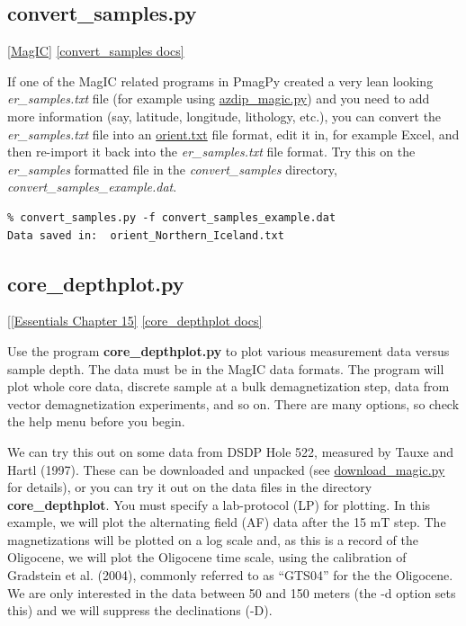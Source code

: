 \documentclass[11pt]{book}
\begin{document}
{{{\subsection{convert\_samples.py}
\href{#MagIC}{[MagIC]}
\href{http://earthref.org/PmagPy/pmagpydocs/convert_samples-module.html}{[convert\_samples docs]}

If one of the MagIC related programs in PmagPy created a very lean looking {\it er\_samples.txt} file (for example using \href{#azdip_magic.py}{azdip\_magic.py}) and you need to add more information (say, latitude, longitude, lithology, etc.), you can convert the {\it er\_samples.txt} file into an \href{#orientation_magic.py}{orient.txt} file format, edit it in, for example Excel, and then re-import it back into the {\it er\_samples.txt} file format.  Try this on the {\it er\_samples} formatted file in the {\it convert\_samples} directory, {\it convert\_samples\_example.dat}.

\begin{verbatim}
% convert_samples.py -f convert_samples_example.dat 
Data saved in:  orient_Northern_Iceland.txt
\end{verbatim}




\subsection{core\_depthplot.py} [\href{http://magician.ucsd.edu/Essentials_2/WebBook2ch15.html#ch15}{[Essentials Chapter 15]}
\href{http://earthref.org/PmagPy/pmagpydocs/core_depthplot-module.html}{[core\_depthplot docs]}

Use the program {\bf core\_depthplot.py} to plot various measurement data versus sample depth.   The data must be in the MagIC data formats.  The program will plot whole core data, discrete sample at a bulk demagnetization step, data from vector demagnetization experiments, and so on.  There are many options, so check the help menu before you begin.     

We can try this out on some data from DSDP Hole 522, measured by Tauxe and Hartl (1997).  \nocite{tauxe97}  These can be downloaded and unpacked (see \href{#download_magic.py}{download\_magic.py} for details),  or you can try it out on the data files in the directory {\bf core\_depthplot}.   You must specify a lab-protocol (LP) for plotting.  In this example, we will plot the alternating field (AF) data after the 15 mT step.  The magnetizations will be plotted on a log scale and, as this is a record of the Oligocene, we will plot the Oligocene time scale, using the calibration of Gradstein et al. (2004),  \nocite{gradstein04} commonly referred to as ``GTS04'' for the the Oligocene.  We are only interested in the data between 50 and 150 meters (the -d option sets this) and we will suppress the declinations (-D).  

}}}
\end{document}
